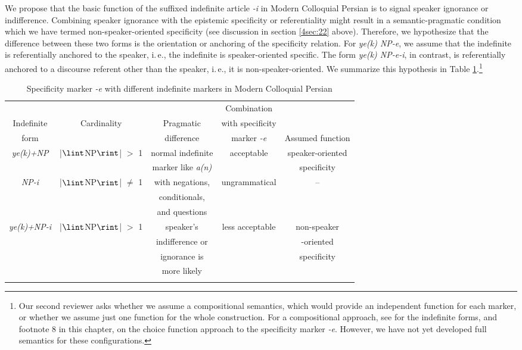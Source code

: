 \documentclass[output=paper]{langsci/langscibook}
\begin{document}
We propose that the basic function of the suffixed indefinite article {\emph{-i}} in Modern Colloquial Persian is to signal speaker ignorance or indifference. Combining speaker ignorance with the epistemic specificity or referentiality might result in a semantic-pragmatic condition which we have termed non-speaker-oriented specificity (see discussion in section \ref{4sec:22} above). Therefore, we hypothesize that the difference between these two forms is the orientation or anchoring of the specificity relation. For {\emph{ye(k) NP-e}}, we assume that the indefinite is referentially anchored to the speaker, i.\,e., the indefinite is speaker-oriented specific. The form {\emph{ye(k) NP-e-i}}, in contrast, is referentially anchored to a discourse referent other than the speaker, i.\,e., it is non-speaker-oriented. We summarize this hypothesis in Table \ref{4table:5}.\footnote{Our second reviewer asks whether we assume a compositional semantics, which would provide an independent function for each marker, or whether we assume just one function for the whole construction. For a compositional approach, see \cite{jasbi:16} for the indefinite forms, and footnote 8 in this chapter, on the choice function approach to the specificity marker {\emph{-e}}. However, we have not yet developed full semantics for these configurations.}

\begin{table}[H]
\centering
{\small{
\begin{tabular}{ccccc}
\lsptoprule
  			&  				& 	  	 	& Combination 			& 				\\
Indefinite 		& Cardinality		& Pragmatic 	& with specificity		& 				\\
form			& \citep{jasbi:16}	& difference	& marker {\emph{-e}}		& Assumed function	\\
\midrule
{\emph{ye(k)+NP}}		& |$\lint$NP$\rint$| $>$ 1		& normal indefinite 			& acceptable				& speaker-oriented 	\\
			& 						& marker like {\emph{a(n)}}	& 						& specificity		\\[1mm]
			
{\emph{NP-i}}			& |$\lint$NP$\rint$| $\not=$ 1		& with negations,			& ungrammatical			& --	\\
			& 						& conditionals, 			& 						& 	\\
			&						& and questions				& 						& 	\\[1mm]
			
{\emph{ye(k)+NP-i}}	& |$\lint$NP$\rint$| $>$ 1		& speaker's   				& less acceptable			& non-speaker 	\\
			&						& indifference or			&						& -oriented	\\
			&						& ignorance is				&						& specificity	\\
			&						& more likely				&						&			\\
\lspbottomrule
\end{tabular}
}}
\caption{Specificity marker {\emph{-e}} with different indefinite markers in Modern Colloquial Persian}\label{4table:5}
\end{table}
\end{document}
